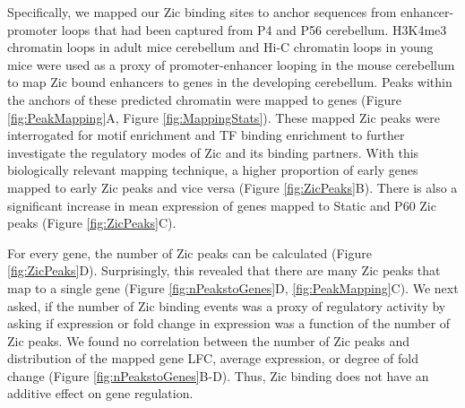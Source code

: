 \documentclass[fleqn,10pt]{wlscirep}
\begin{document}
Specifically, we mapped our Zic binding sites to anchor sequences from enhancer-promoter loops that had been captured from P4 and P56 cerebellum. H3K4me3 chromatin loops in adult mice cerebellum \cite{Yamada2019SensoryLearning} and Hi-C chromatin loops in young mice \cite{Goodman2020TheBrain}  were used as a proxy of promoter-enhancer looping in the mouse cerebellum  to map Zic bound enhancers to genes in the developing cerebellum. Peaks within the anchors of these predicted chromatin were mapped to genes (Figure \ref{fig:PeakMapping}A, Figure \ref{fig:MappingStats}). These mapped Zic peaks were interrogated for motif enrichment and TF binding enrichment to further investigate the regulatory modes of Zic and its binding partners. With this biologically relevant mapping technique, a higher proportion of early genes mapped to early Zic peaks and vice versa (Figure \ref{fig:ZicPeaks}B). There is also a significant increase in mean expression of genes mapped to Static and P60 Zic peaks (Figure \ref{fig:ZicPeaks}C).

For every gene, the number of Zic peaks can be calculated (Figure \ref{fig:ZicPeaks}D). Surprisingly, this revealed that there are many Zic peaks that map to a single gene (Figure \ref{fig:nPeakstoGenes}D, \ref{fig:PeakMapping}C). We next asked, if the number of Zic binding events was a proxy of regulatory activity by asking if expression or fold change in expression was a function of the number of Zic peaks. We found no correlation between the number of Zic peaks and distribution of the mapped gene LFC, average expression, or degree of fold change (Figure \ref{fig:nPeakstoGenes}B-D). Thus, Zic binding does not have an additive effect on gene regulation. 
\end{document}
